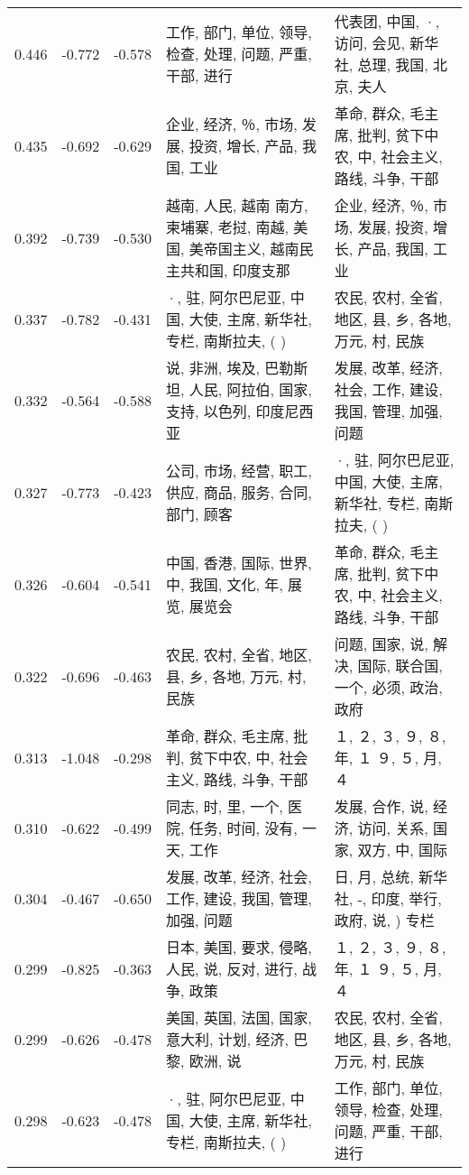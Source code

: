 \begin{tabular}{cccp{5cm}p{5cm}}
0.446 & -0.772 & -0.578 & 工作, 部门, 单位, 领导, 检查, 处理, 问题, 严重, 干部, 进行 & 代表团, 中国, ·, 访问, 会见, 新华社, 总理, 我国, 北京, 夫人 \\
0.435 & -0.692 & -0.629 & 企业, 经济, ％, 市场, 发展, 投资, 增长, 产品, 我国, 工业 & 革命, 群众, 毛主席, 批判, 贫下中农, 中, 社会主义, 路线, 斗争, 干部 \\
0.392 & -0.739 & -0.530 & 越南, 人民, 越南 南方, 柬埔寨, 老挝, 南越, 美国, 美帝国主义, 越南民主共和国, 印度支那 & 企业, 经济, ％, 市场, 发展, 投资, 增长, 产品, 我国, 工业 \\
0.337 & -0.782 & -0.431 & ·, 驻, 阿尔巴尼亚, 中国, 大使, 主席, 新华社, 专栏, 南斯拉夫, ( ) & 农民, 农村, 全省, 地区, 县, 乡, 各地, 万元, 村, 民族 \\
0.332 & -0.564 & -0.588 & 说, 非洲, 埃及, 巴勒斯坦, 人民, 阿拉伯, 国家, 支持, 以色列, 印度尼西亚 & 发展, 改革, 经济, 社会, 工作, 建设, 我国, 管理, 加强, 问题 \\
0.327 & -0.773 & -0.423 & 公司, 市场, 经营, 职工, 供应, 商品, 服务, 合同, 部门, 顾客 & ·, 驻, 阿尔巴尼亚, 中国, 大使, 主席, 新华社, 专栏, 南斯拉夫, ( ) \\
0.326 & -0.604 & -0.541 & 中国, 香港, 国际, 世界, 中, 我国, 文化, 年, 展览, 展览会 & 革命, 群众, 毛主席, 批判, 贫下中农, 中, 社会主义, 路线, 斗争, 干部 \\
0.322 & -0.696 & -0.463 & 农民, 农村, 全省, 地区, 县, 乡, 各地, 万元, 村, 民族 & 问题, 国家, 说, 解决, 国际, 联合国, 一个, 必须, 政治, 政府 \\
0.313 & -1.048 & -0.298 & 革命, 群众, 毛主席, 批判, 贫下中农, 中, 社会主义, 路线, 斗争, 干部 & １, ２, ３, ９, ８, 年, １ ９, ５, 月, ４ \\
0.310 & -0.622 & -0.499 & 同志, 时, 里, 一个, 医院, 任务, 时间, 没有, 一天, 工作 & 发展, 合作, 说, 经济, 访问, 关系, 国家, 双方, 中, 国际 \\
0.304 & -0.467 & -0.650 & 发展, 改革, 经济, 社会, 工作, 建设, 我国, 管理, 加强, 问题 & 日, 月, 总统, 新华社, -, 印度, 举行, 政府, 说, ) 专栏 \\
0.299 & -0.825 & -0.363 & 日本, 美国, 要求, 侵略, 人民, 说, 反对, 进行, 战争, 政策 & １, ２, ３, ９, ８, 年, １ ９, ５, 月, ４ \\
0.299 & -0.626 & -0.478 & 美国, 英国, 法国, 国家, 意大利, 计划, 经济, 巴黎, 欧洲, 说 & 农民, 农村, 全省, 地区, 县, 乡, 各地, 万元, 村, 民族 \\
0.298 & -0.623 & -0.478 & ·, 驻, 阿尔巴尼亚, 中国, 大使, 主席, 新华社, 专栏, 南斯拉夫, ( ) & 工作, 部门, 单位, 领导, 检查, 处理, 问题, 严重, 干部, 进行 \\

\end{tabular}
